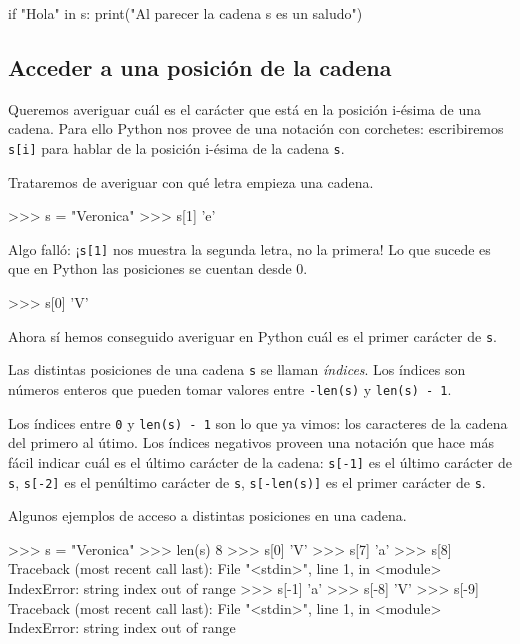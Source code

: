 \begin{codigo-python-sn}
if "Hola" in s:
    print("Al parecer la cadena s es un saludo")
\end{codigo-python-sn}

\subsection{Acceder a una posición de la cadena}

Queremos averiguar cuál es el carácter que está en la posición i-ésima de
una cadena.  Para ello Python nos provee de una notación con corchetes:
escribiremos \lstinline+s[i]+ para hablar de la posición i-ésima de la cadena
\lstinline!s!.

Trataremos de averiguar con qué letra empieza una cadena.

\begin{codigo-python-sn}
>>> s = "Veronica"
>>> s[1]
'e'
\end{codigo-python-sn}

Algo falló: ¡\lstinline+s[1]+ nos muestra la segunda letra, no la
primera! Lo que sucede es que en Python las posiciones se cuentan
desde 0.

\begin{codigo-python-sn}
>>> s[0]
'V'
\end{codigo-python-sn}

Ahora sí hemos conseguido averiguar en Python cuál es el primer carácter de
\lstinline!s!.

\begin{atencion}
Las distintas posiciones de una cadena \lstinline!s! se llaman
{\it índices}. Los índices son números enteros que pueden tomar
valores entre \lstinline!-len(s)! y \lstinline!len(s) - 1!.

Los índices entre \lstinline!0! y \lstinline!len(s) - 1! son lo que ya
vimos: los caracteres de la cadena del primero al útimo. Los índices
negativos proveen una notación que hace más fácil indicar cuál es el último
carácter de la cadena: \lstinline!s[-1]! es el último carácter de
\lstinline!s!, \lstinline!s[-2]! es el penúltimo carácter de \lstinline!s!,
\lstinline!s[-len(s)]! es el primer carácter de \lstinline!s!.
\end{atencion}

Algunos ejemplos de acceso a distintas posiciones en una cadena.

\begin{codigo-python-sn}
>>> s = "Veronica"
>>> len(s)
8
>>> s[0]
'V'
>>> s[7]
'a'
>>> s[8]
Traceback (most recent call last):
  File "<stdin>", line 1, in <module>
IndexError: string index out of range
>>> s[-1]
'a'
>>> s[-8]
'V'
>>> s[-9]
Traceback (most recent call last):
  File "<stdin>", line 1, in <module>
IndexError: string index out of range
\end{codigo-python-sn}

